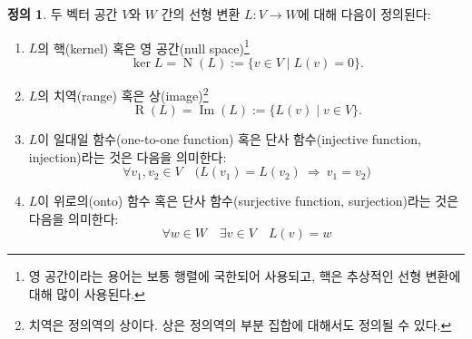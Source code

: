 \documentclass[unfonts,oneside,a4paper]{oblivoir}
\theoremstyle{definition}
\newtheorem{definition}{정의}
\theoremstyle{theorem}
\theoremstyle{remark}
\theoremstyle{remark}
\theoremstyle{remark}
\theoremstyle{remark}
\renewcommand{\vec}[1]{\bm{\mathit{#1}}}
\newcommand{\vecz}{\bm{\mathrm{0}}}
\DeclareMathOperator{\Null}{N}
\DeclareMathOperator{\Image}{Im}
\DeclareMathOperator{\Range}{R}
\begin{document}
\begin{definition}
    두 벡터 공간 $V$와 $W$ 간의 선형 변환 $L: V \rightarrow W$에 대해 다음이 정의된다:
    \begin{enumerate}
        \item $L$의 핵(kernel) 혹은 영 공간(null space)\footnote{영 공간이라는 용어는 보통 행렬에 국한되어 사용되고, 핵은 추상적인 선형 변환에 대해 많이 사용된다.}
            \begin{equation*}
                \ker L = \Null (L) := \{\vec v \in V \mid L(\vec v) = \vecz\}.
            \end{equation*} 
        \item $L$의 치역(range) 혹은 상(image)\footnote{치역은 정의역의 상이다. 상은 정의역의 부분 집합에 대해서도 정의될 수 있다.}
            \begin{equation*}
                \Range (L) = \Image (L) := \{L(\vec v) \mid \vec v \in V\}.
            \end{equation*}
        \item $L$이 일대일 함수(one-to-one function) 혹은 단사 함수(injective function, injection)라는 것은 다음을 의미한다:
            \begin{equation*}
                \forall \vec v_1, \vec v_2 \in V \quad \bigl(L(\vec v_1) = L(\vec v_2)\ \Rightarrow\ \vec v_1 = \vec v_2\bigr)
            \end{equation*}
        \item $L$이 위로의(onto) 함수 혹은 단사 함수(surjective function, surjection)라는 것은 다음을 의미한다:
            \begin{equation*}
                \forall \vec w \in W \quad \exists \vec v \in V \quad L(\vec v) = \vec w
            \end{equation*}
    \end{enumerate}
\end{definition}
\end{document}
